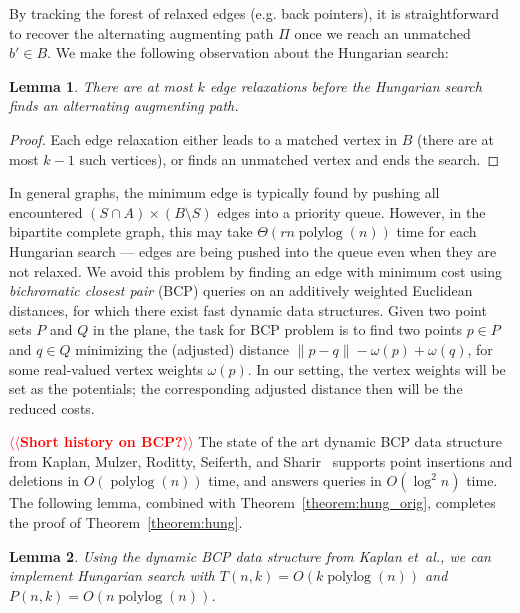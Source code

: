 \documentclass[11pt]{article}
\makeatletter
\def\etal{\textsl{et~al.}}
\def\polylog{\mathop{\mathrm{polylog}}}
\theoremstyle{plain}
\newtheorem{lemma}{Lemma}[section]
\numberwithin{figure}{section}
\def\n@te#1{\textsf{\boldmath \textbf{$\langle\!\langle$#1$\rangle\!\rangle$}}\leavevmode}
\def\note#1{\textcolor{red}{\n@te{#1}}}
\makeatother
\begin{document}
By tracking the forest of relaxed edges (e.g. back pointers), it is
straightforward to recover the alternating augmenting path $\Pi$ once we reach
an unmatched $b' \in B$.
We make the following observation about the Hungarian search:

\begin{lemma}
\label{lemma:hungsearch_length}
There are at most $k$ edge relaxations before the Hungarian search finds an
alternating augmenting path.
\end{lemma}

\begin{proof}
Each edge relaxation either leads to a matched vertex in $B$ (there are at most
$k-1$ such vertices), or finds an unmatched vertex and ends the search.
\end{proof}

In general graphs, the minimum edge is typically found by pushing all
encountered $(S \cap A) \times (B \setminus S)$ edges into a priority queue.
However, in the bipartite complete graph, this may take $\Theta(rn\polylog(n))$
time for each Hungarian search --- edges are being pushed into the queue even when
they are not relaxed.
We avoid this problem by finding an edge with minimum cost using \emph{bichromatic
closest pair} (BCP) queries on an additively weighted Euclidean distances,
for which there exist fast %
dynamic data structures.
Given two point sets
$P$ and $Q$ in the plane,
the task for BCP problem is to find two points $p \in P$ and $q \in Q$ minimizing the (adjusted) distance
$\|p - q\| - \omega(p) + \omega(q)$, for some real-valued vertex weights
$\omega(p)$.
In our setting, the vertex weights will be set as the potentials; the corresponding adjusted distance then will be the reduced costs.

\note{Short history on BCP?}
The state of the art dynamic BCP data structure from Kaplan, Mulzer,
Roditty, Seiferth, and Sharir~\cite{KMRSS17} supports point insertions and deletions in
$O(\polylog(n))$ time, and answers queries in $O(\log^2 n)$ time.
The following lemma, combined with Theorem~\ref{theorem:hung_orig}, completes
the proof of Theorem~\ref{theorem:hung}.

\begin{lemma}
\label{lemma:hs_time}
Using the dynamic BCP data structure from Kaplan \etal, we can implement
Hungarian search with $T(n, k) = O(k\polylog(n))$ and
$P(n, k) = O(n\polylog(n))$.
\end{lemma}
\end{document}
